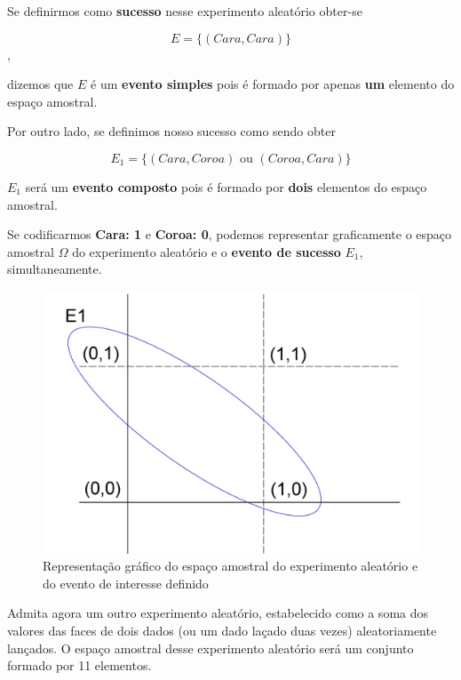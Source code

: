 \documentclass[
]{book}
\begin{document}
\hfill\break

Se definirmos como \textbf{sucesso} nesse experimento aleatório obter-se

\hfill\break

\[
E=\{(Cara, Cara)\}
\],

\hfill\break

dizemos que \(E\) é um \textbf{evento simples} pois é formado por apenas \textbf{um} elemento do espaço amostral.

\hfill\break

Por outro lado, se definimos nosso sucesso como sendo obter

\hfill\break

\[
E_{1}=\{(Cara, Coroa)  \text{ ou } (Coroa, Cara)\}
\]

\hfill\break

\(E_{1}\) será um \textbf{evento composto} pois é formado por \textbf{dois} elementos do espaço amostral.

\hfill\break

Se codificarmos \textbf{Cara: 1} e \textbf{Coroa: 0}, podemos representar graficamente o espaço amostral \(\Omega\) do experimento aleatório e o \textbf{evento de sucesso} \(E_{1}\), simultaneamente.

\hfill\break

\begin{figure}

{\centering \includegraphics[width=0.5\linewidth]{images4/evento_grafico} 

}

\caption{Representação gráfico do espaço amostral do experimento aleatório e do evento de interesse definido}\label{fig:unnamed-chunk-54}
\end{figure}

\hfill\break

Admita agora um outro experimento aleatório, estabelecido como a soma dos valores das faces de dois dados (ou um dado laçado duas vezes) aleatoriamente lançados. O espaço amostral desse experimento aleatório será um conjunto formado por 11 elementos.
\end{document}
